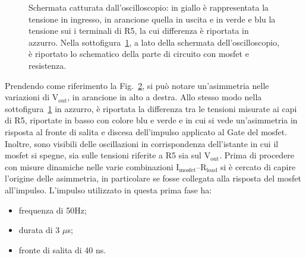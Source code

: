 \begin{figure}
\begin{subfigure}{\textwidth}
  \caption{ }
  \label{TransientTest:sfig3}
\end{subfigure}
\caption{Schermata catturata dall'oscilloscopio: in giallo è rappresentata la tensione in ingresso, in arancione quella in uscita e in verde e blu la tensione sui i terminali di R5, la cui differenza è riportata in  azzurro. Nella sottofigura~\ref{TransientTest:sfig3}, a lato della schermata dell'oscilloscopio, è riportato lo schematico della parte di circuito con mosfet e resistenza.}
\label{TransientTest}
\end{figure}
Prendendo come riferimento la Fig.~\ref{TransientTest}, si può notare un'asimmetria nelle variazioni di $\mathrm{V_{out}}$, in arancione in alto a destra.%
Allo stesso modo nella sottofigura~\ref{TransientTest:sfig3} in azzurro, è riportata la differenza tra le tensioni misurate ai capi di R5, riportate in basso con colore blu e verde e in cui si vede un'asimmetria in risposta al fronte di salita e discesa dell'impulso applicato al Gate del mosfet. 
Inoltre, sono visibili delle oscillazioni in corrispondenza dell'istante in cui il mosfet si spegne, sia sulle tensioni riferite a R5 sia sul $\mathrm{V_{out}}$.
Prima di procedere con misure dinamiche nelle varie combinazioni $\mathrm{I_{mosfet}}$--$\mathrm{R_{load}}$ si è cercato di capire l'origine delle asimmetria, in particolare se fosse collegata alla risposta del mosfet all'impulso.
L'impulso utilizzato in questa prima fase ha:
\begin{itemize}
  \item frequenza di 50Hz;
  \item durata di 3 $\mu$s;
  \item fronte di salita di 40 ns.
\end{itemize}

